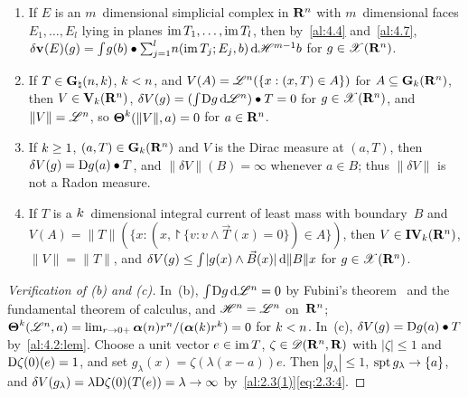 \begin{example}
    \label{al:4.8}
    \begin{enumerate}
        \item If $E$ is an $m$~dimensional simplicial complex in $\mathbf{R}^{n}$ with $m$~dimensional
            faces $E_1, \ldots, E_l$ lying in planes $\operatorname{im} T_1, \ldots, \operatorname{im} T_l$, then by~\ref{al:4.4}
            and~\ref{al:4.7}, $\delta \mathbf{v}_{}(E)(g) = {\textstyle\int_{}^{}} g(b) \bullet {\textstyle\sum_{j=1}^{l}}
            n(\operatorname{im} T_j; E_j, b) \,\mathrm{d} \mathscr{H}^{m-1} b$ for $g \in \mathscr{X}(\mathbf{R}^{n})$.
        \item If $T \in \mathbf{G}_{\natural}(n,k)$, $k < n$, and $V(A) = \mathscr{L}^{n}(\{ x : (x,T)
            \in A \})$ for $A \subseteq \mathbf{G}_{k}(\mathbf{R}^{n})$, then $V \in \mathbf{V}_{k}(\mathbf{R}^{n})$, $\delta
            V(g) = ({\textstyle\int_{}^{}} \mathrm{D} g \,\mathrm{d} \mathscr{L}^{n}) \bullet T = 0$ for $g \in \mathscr{X}(\mathbf{R}^{n})$, and
            $\|V\| = \mathscr{L}^{n}$, so $\boldsymbol{\Theta}^{k}(\|V\|,a) = 0$ for $a \in \mathbf{R}^{n}$.
        \item If $k \ge 1$, $(a,T) \in \mathbf{G}_{k}(\mathbf{R}^{n})$ and $V$ is the Dirac measure at
            $(a,T)$, then $\delta V(g) = \mathrm{D} g(a) \bullet T$, and $\|\delta V\|(B) = \infty$ whenever
            $a \in B$; thus $\|\delta V\|$ is not a Radon measure.
        \item If $T$ is a $k$~dimensional integral current of least mass with boundary~$B$
            and $V(A) = \|T\|(\{ x : (x, \project{\{ v : v \wedge \vec T(x) = 0 \}}) \in A \})$, then
            $V \in \mathbf{IV}_{k}(\mathbf{R}^{n})$, $\|V\| = \|T\|$, and $\delta V(g) \le {\textstyle\int_{}^{}} |g(x)
            \wedge \vec B(x)| \,\mathrm{d} \|B\| x$ for $g \in \mathscr{X}(\mathbf{R}^{n})$.
    \end{enumerate}
\end{example}

\begin{proof}[Verification of (b) and (c)]
    In~(b), ${\textstyle\int_{}^{}} \mathrm{D} g \,\mathrm{d} \mathscr{L}^{n} = 0$ by Fubini's theorem~\cite[2.6.2]{Federer1969}
    and the fundamental theorem of calculus, and $\mathscr{H}^{n} = \mathscr{L}^{n}$ on~$\mathbf{R}^{n}$;
    $\boldsymbol{\Theta}^{k}(\mathscr{L}^{n},a) = \lim_{r \to 0+} \boldsymbol{\alpha}(n) r^{n} /
    (\boldsymbol{\alpha}(k) r^{k}) = 0$ for $k < n$. In~(c), $\delta V(g) = \mathrm{D} g(a)
    \bullet T$ by~\ref{al:4.2:lem}. Choose a unit vector $e \in \operatorname{im} T$, $\zeta \in
    \mathscr{D}(\mathbf{R}^{n},\mathbf{R})$ with $|\zeta| \le 1$ and $\mathrm{D} \zeta(0)(e) = 1$, and set $g_\lambda(x)
    = \zeta(\lambda(x-a)) e$. Then $|g_\lambda| \le 1$, $\operatorname{spt} g_\lambda \to \{a\}$, and $\delta
    V(g_\lambda) = \lambda \mathrm{D} \zeta(0)(T(e)) = \lambda \to \infty$ by~\ref{al:2.3(1)}\eqref{eq:2.3:4}.
\end{proof}

